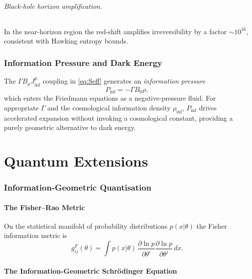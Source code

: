 \documentclass[12pt,a4paper]{article}
\begin{document}
\paragraph{Black-hole horizon amplification.}
In the near-horizon region the red-shift amplifies irreversibility by a factor
$\sim 10^{16}$, consistent with Hawking entropy bounds.

\section{Information Pressure and Dark Energy}
\label{sec:dark-energy}

The $\Gamma B_\mu J_{\inf}^\mu$ coupling in \eqref{eq:Seff} generates an
\emph{information pressure}
\begin{equation}
  P_{\inf} = -\Gamma B_0 \rho ,
  \label{eq:Pinf}
\end{equation}
which enters the Friedmann equations as a negative-pressure fluid.  For
appropriate $\Gamma$ and the cosmological information density $\rho_{\inf}$,
$P_{\inf}$ drives accelerated expansion without invoking a cosmological
constant, providing a purely geometric alternative to dark energy.

\part{Quantum Extensions}

\section{Information-Geometric Quantisation}
\label{sec:quantisation}

\subsection{The Fisher--Rao Metric}

On the statistical manifold of probability distributions $p(x|\theta)$ the
Fisher information metric is
\begin{equation}
  g_{ij}^{F}(\theta)
  = \int p(x|\theta)\,
    \frac{\partial\ln p}{\partial\theta^i}
    \frac{\partial\ln p}{\partial\theta^j}\,dx .
  \label{eq:fisher}
\end{equation}

\subsection{The Information-Geometric Schrödinger Equation}
\end{document}
